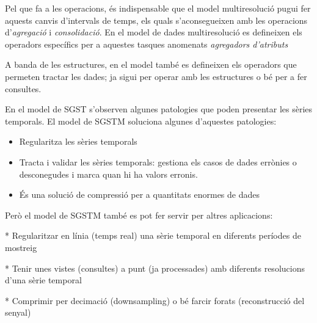 Pel que fa a les operacions, és indispensable que el model multiresolució pugui fer aquests canvis d'intervals de temps, els quals s'aconsegueixen amb les operacions d'\emph{agregació} i \emph{consolidació}. En el model de dades multiresolució es defineixen els operadors específics per a aquestes tasques anomenats \emph{agregadors d'atributs}


A banda de les estructures, en el model també es defineixen els
operadors que permeten tractar les dades; ja sigui per operar amb les
estructures o bé per a fer consultes.









En el model de SGST s'observen algunes patologies que poden presentar les sèries temporals. El model de SGSTM soluciona algunes d'aquestes patologies:

\begin{itemize}
\item Regularitza les sèries temporals
\item Tracta i validar les sèries temporals: gestiona els casos de dades errònies o desconegudes i marca quan hi ha valors erronis.
\item És una solució de compressió per a quantitats enormes de dades
\end{itemize}


Però el model de SGSTM també es pot fer servir per altres aplicacions:

* Regularitzar en línia (temps real) una sèrie temporal en diferents períodes de mostreig

* Tenir unes vistes (consultes) a punt (ja processades) amb diferents resolucions d'una sèrie temporal

* Comprimir per decimació (downsampling) o bé farcir forats (reconstrucció del senyal)











